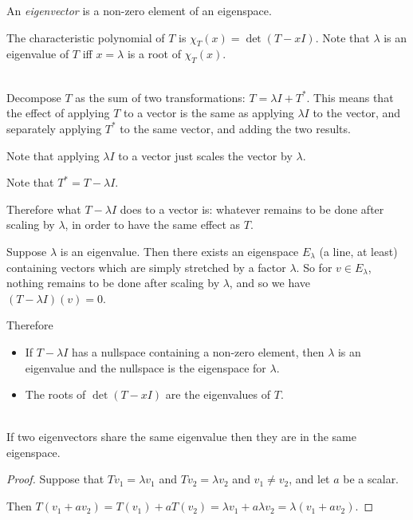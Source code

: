\begin{definition*}[eigenvector]
  An \textit{eigenvector} is a non-zero element of an eigenspace.
\end{definition*}

\begin{definition*}
  The characteristic polynomial of $T$ is $\chi_T(x) = \det(T - xI)$. Note that
  $\lambda$ is an eigenvalue of $T$ iff $x=\lambda$ is a root of $\chi_T(x)$.
\end{definition*}

\begin{intuition*}~\\
  Decompose $T$ as the sum of two transformations: $T = \lambda I + T^*$. This
  means that the effect of applying $T$ to a vector is the same as applying
  $\lambda I$ to the vector, and separately applying $T^*$ to the same vector,
  and adding the two results.

  Note that applying $\lambda I$ to a vector just scales the vector by $\lambda$.

  Note that $T^* = T - \lambda I$.

  Therefore what $T - \lambda I$ does to a vector is: whatever remains to be done after
  scaling by $\lambda$, in order to have the same effect as $T$.

  Suppose $\lambda$ is an eigenvalue. Then there exists an eigenspace
  $E_\lambda$ (a line, at least) containing vectors which are simply stretched
  by a factor $\lambda$. So for $v \in E_\lambda$, nothing remains to be done
  after scaling by $\lambda$, and so we have $(T - \lambda I)(v) = 0$.

  Therefore
  \begin{itemize}
  \item If $T - \lambda I$ has a nullspace containing a non-zero element, then
    $\lambda$ is an eigenvalue and the nullspace is the eigenspace for
    $\lambda$.
  \item The roots of $\det(T - xI)$ are the eigenvalues of $T$.
  \end{itemize}

\end{intuition*}

\begin{remark*}~\\
  If two eigenvectors share the same eigenvalue then they are in the same eigenspace.
\end{remark*}

\begin{proof}
  Suppose that $Tv_1 = \lambda v_1$ and $Tv_2 = \lambda v_2$ and
  $v_1 \neq v_2$, and let $a$ be a scalar.

  Then
  $T(v_1 + av_2) = T(v_1) + aT(v_2) = \lambda v_1 + a\lambda v_2 = \lambda(v_1
  + av_2)$.
\end{proof}

